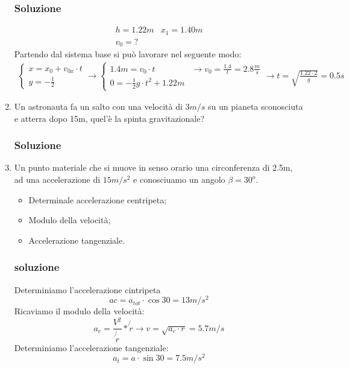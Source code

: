 \documentclass{report}
\begin{document}
\begin{enumerate}
  \subsubsection{Soluzione}
  \label{sec:soluzione2}
  \begin{eqnarray*}
    h=1.22m & x_1=1.40m\\
    v_0=?
  \end{eqnarray*}
  Partendo dal sistema base si può lavorare nel seguente modo:
  \begin{eqnarray*}
    \begin{cases}
      x=x_0+v_{0x}\cdot t\\
      y=-\frac{1}{2}
    \end{cases}\to
    \begin{cases}
      1.4m=v_0\cdot t & \to v_0=\frac{1.4}{t}=2.8\frac{m}{s}\\
      0=-\frac{1}{2}g\cdot t^2+1.22m
    \end{cases} \to t=\sqrt{\frac{1.22\cdot 2}{g}}=0.5s 
  \end{eqnarray*}
\item Un astronauta fa un salto con una velocità di $3m/s$ su un pianeta sconosciuta e atterra dopo 15m, quel'è la spinta gravitazionale?
  
\subsubsection{Soluzione}
\label{sec:sol3}

    \item Un punto materiale che si muove in senso orario una circonferenza di 2.5m, ad una accelerazione di $15m/s^2$ e conosciuamo un angolo $\beta = 30^o$.
    \begin{itemize}
    \item Determinale accelerazione centripeta;
    \item Modulo della velocità;
    \item Accelerazione tangenziale.
    \end{itemize}
    
\subsubsection{soluzione}
\label{sec:sol4}

    Determiniamo l'accelerazione cintripeta
    \begin{equation*}
      ac=a_{tot} \cdot \cos 30 = 13m/s^2
    \end{equation*}
    Ricaviamo il modulo della velocità:
    \begin{equation*}
      a_c=\frac{V^2}{\not{r}} *\not{r} \to v=\sqrt{a_c\cdot r} = 5.7m/s
    \end{equation*}
    Determiniamo l'accelerazione tangenziale:
    \begin{equation*}
      a_t=a\cdot \sin 30 = 7.5m/s^2
    \end{equation*}
    

\end{enumerate}
\end{document}
